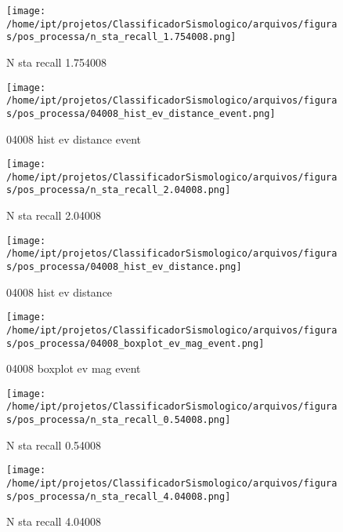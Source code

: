     \begin{figure}[H]
        \centering
        \texttt{[image: /home/ipt/projetos/ClassificadorSismologico/arquivos/figuras/pos\_processa/n\_sta\_recall\_1.754008.png]}
        \caption{N sta recall 1.754008}
        \label{fig:n_sta_recall_1.754008}
    \end{figure}
                

    \begin{figure}[H]
        \centering
        \texttt{[image: /home/ipt/projetos/ClassificadorSismologico/arquivos/figuras/pos\_processa/04008\_hist\_ev\_distance\_event.png]}
        \caption{04008 hist ev distance event}
        \label{fig:04008_hist_ev_distance_event}
    \end{figure}
                

    \begin{figure}[H]
        \centering
        \texttt{[image: /home/ipt/projetos/ClassificadorSismologico/arquivos/figuras/pos\_processa/n\_sta\_recall\_2.04008.png]}
        \caption{N sta recall 2.04008}
        \label{fig:n_sta_recall_2.04008}
    \end{figure}
                

    \begin{figure}[H]
        \centering
        \texttt{[image: /home/ipt/projetos/ClassificadorSismologico/arquivos/figuras/pos\_processa/04008\_hist\_ev\_distance.png]}
        \caption{04008 hist ev distance}
        \label{fig:04008_hist_ev_distance}
    \end{figure}
                

    \begin{figure}[H]
        \centering
        \texttt{[image: /home/ipt/projetos/ClassificadorSismologico/arquivos/figuras/pos\_processa/04008\_boxplot\_ev\_mag\_event.png]}
        \caption{04008 boxplot ev mag event}
        \label{fig:04008_boxplot_ev_mag_event}
    \end{figure}
                

    \begin{figure}[H]
        \centering
        \texttt{[image: /home/ipt/projetos/ClassificadorSismologico/arquivos/figuras/pos\_processa/n\_sta\_recall\_0.54008.png]}
        \caption{N sta recall 0.54008}
        \label{fig:n_sta_recall_0.54008}
    \end{figure}
                

    \begin{figure}[H]
        \centering
        \texttt{[image: /home/ipt/projetos/ClassificadorSismologico/arquivos/figuras/pos\_processa/n\_sta\_recall\_4.04008.png]}
        \caption{N sta recall 4.04008}
        \label{fig:n_sta_recall_4.04008}
    \end{figure}
                

